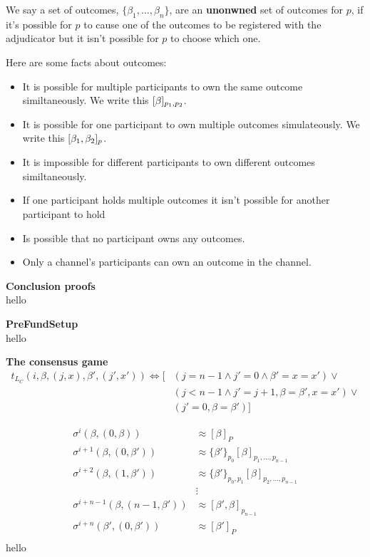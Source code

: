 We say a set of outcomes, $\{ \beta_1, \dots, \beta_n \}$, are an \textbf{unonwned} set of outcomes for $p$, if it's possible for $p$ to cause one of the outcomes to be registered with the adjudicator but it isn't possible for $p$ to choose which one.

Here are some facts about outcomes:
\begin{itemize}
  \item It is possible for multiple participants to own the same outcome similtaneously. We write this $[\beta]_{p_1, p_2}$.
  \item It is possible for one participant to own multiple outcomes simulateously. We write this $[\beta_1, \beta_2]_p$.
  \item It is impossible for different participants to own different outcomes similtaneously.
  \item If one participant holds multiple outcomes it isn't possible for another participant to hold
  \item Is possible that no participant owns any outcomes.
  \item Only a channel's participants can own an outcome in the channel.
\end{itemize}


\begin{exmp}
  \textbf{Conclusion proofs} \\
  hello
\end{exmp}

\begin{exmp}
  \textbf{PreFundSetup} \\
  hello
\end{exmp}

\begin{exmp}
  \textbf{The consensus game} \\
  \begin{align*}
    t_{L_C}(i, \beta, (j, x), \beta', (j', x')) \Leftrightarrow
      [ & (j=n-1 \wedge j'= 0 \wedge \beta' = x = x')  \vee \\
      & (j < n-1 \wedge j' = j+1, \beta = \beta', x = x') \vee \\
      & (j'=0, \beta = \beta') ]
  \end{align*}

  \begin{align*}
    \sigma^{i}(\beta, (0, \beta)) & \approx [\beta]_P \\
    \sigma^{i+1}(\beta, (0, \beta')) & \approx \{\beta'\}_{p_0}[\beta]_{p_1, ..., p_{n-1}} \\
    \sigma^{i+2}(\beta, (1, \beta')) & \approx \{\beta'\}_{p_0, p_1}[\beta]_{p_2, ..., p_{n-1}} \\
    &\vdots\\
    \sigma^{i+n-1}(\beta, (n-1, \beta')) & \approx [\beta', \beta]_{p_{n-1}} \\
    \sigma^{i+n}(\beta', (0, \beta')) & \approx [\beta']_{P} \\
  \end{align*}
    hello
\end{exmp}


